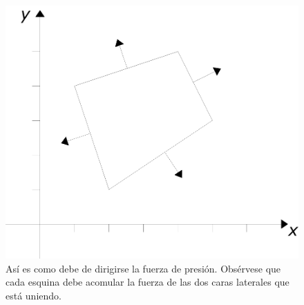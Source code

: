 \begin{figure}
 \centering
 \includegraphics[]{Img/presion_bien}
 \caption[Vectores de presión correctos]{ 
 Así es como debe de dirigirse la fuerza de presión. Obsérvese que cada esquina debe acomular la fuerza de las dos caras laterales que está uniendo.
 } \label{presionBien:fig}
\end{figure}
